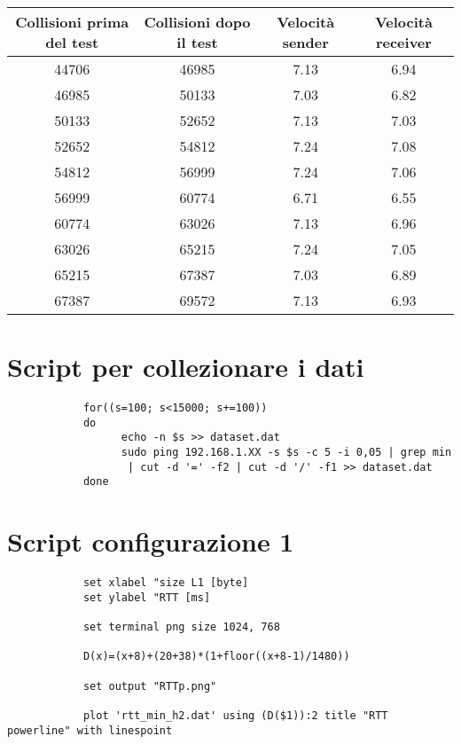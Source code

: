 \documentclass[../lab2.tex]{subfiles}
\begin{document}
\begin{appendices}

  \begin{tabular}{|c|c|c|c|}
    \hline
    Collisioni prima del test & Collisioni dopo il test & Velocità sender & Velocità receiver\\
    \hline    
    44706 & 46985	& 7.13	& 6.94 \\
    \hline    
    46985 & 50133 &	7.03	&6.82\\
    \hline    
    50133 & 52652 &	7.13	&7.03\\
    \hline  
    52652 & 54812 &	7.24	&7.08\\
    \hline  
    54812 & 56999 &	7.24	&7.06\\
    \hline  
    56999 & 60774 &	6.71	&6.55\\
    \hline  
    60774 & 63026 &	7.13	&6.96\\
    \hline  
    63026 & 65215 &	7.24	&7.05\\
    \hline  
    65215 & 67387 &	7.03	&6.89\\
    \hline  
    67387 &	69572 &   7.13	&6.93 \\
    \hline
\end{tabular}

    \section{Script per collezionare i dati}
        \begin{verbatim}
            for((s=100; s<15000; s+=100))
            do
	              echo -n $s >> dataset.dat 
	              sudo ping 192.168.1.XX -s $s -c 5 -i 0,05 | grep min 
                   | cut -d '=' -f2 | cut -d '/' -f1 >> dataset.dat
            done
            \end{verbatim}
    \section{Script configurazione 1}
        \begin{verbatim}
            set xlabel "size L1 [byte]
            set ylabel "RTT [ms]

            set terminal png size 1024, 768

            D(x)=(x+8)+(20+38)*(1+floor((x+8-1)/1480))

            set output "RTTp.png"

            plot 'rtt_min_h2.dat' using (D($1)):2 title "RTT powerline" with linespoint


\end{verbatim}
\end{appendices}
\end{document}
